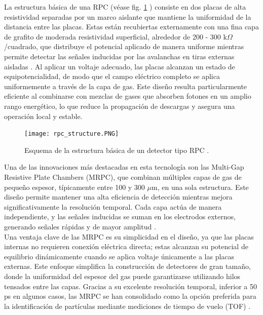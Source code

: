 \documentclass{article}
\begin{document}
\noindent La estructura básica de una RPC (véase fig. \ref{fig:RPC} ) consiste en dos placas de alta resistividad separadas por un marco aislante que mantiene la uniformidad de la distancia entre las placas. Estas están recubiertas externamente con una fina capa de grafito de moderada resistividad superficial, alrededor de 200 - 300 k$\Omega$/cuadrado, que distribuye el potencial aplicado de manera uniforme mientras permite detectar las señales inducidas por las avalanchas en tiras externas aisladas \cite{sauli2015gaseous4}. Al aplicar un voltaje adecuado, las placas alcanzan un estado de equipotencialidad, de modo que el campo eléctrico completo se aplica uniformemente a través de la capa de gas. Este diseño resulta particularmente eficiente al combinarse con mezclas de gases que absorben fotones en un amplio rango energético, lo que reduce la propagación de descargas y asegura una operación local y estable.

\begin{figure}[H]
    \centering
    \texttt{[image: rpc\_structure.PNG]}
    \caption{Esquema de la estructura básica de un detector tipo RPC \cite{sauli2015gaseous4}.}
    \label{fig:RPC}
\end{figure}

\noindent Una de las innovaciones más destacadas en esta tecnología son las Multi-Gap Resistive Plate Chambers (MRPC), que combinan múltiples capas de gas de pequeño espesor, típicamente entre 100  y 300 $\mu$m, en una sola estructura. Este diseño permite mantener una alta eficiencia de detección mientras mejora significativamente la resolución temporal. Cada capa actúa de manera independiente, y las señales inducidas se suman en los electrodos externos, generando señales rápidas y de mayor amplitud \cite{alici2013mrpc}. \\

\noindent Una ventaja clave de las MRPC es su simplicidad en el diseño, ya que las placas internas no requieren conexión eléctrica directa; estas alcanzan su potencial de equilibrio dinámicamente cuando se aplica voltaje únicamente a las placas externas. Este enfoque simplifica la construcción de detectores de gran tamaño, donde la uniformidad del espesor del gas puede garantizarse utilizando hilos tensados entre las capas. Gracias a su excelente resolución temporal, inferior a 50 ps en algunos casos, las MRPC se han consolidado como la opción preferida para la identificación de partículas mediante mediciones de tiempo de vuelo (TOF) \cite{alici2013mrpc}. \\
\end{document}
